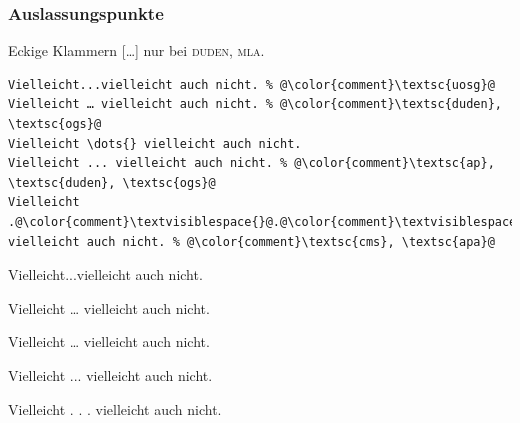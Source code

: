 \documentclass[aspectratio=169, 10pt]{beamer}
\begin{document}
\begin{frame}[fragile]
    \frametitle{Auslassungspunkte}
    Eckige Klammern [\dots{}] nur bei \textsc{duden}, \textsc{mla}.

    \pause

    \begin{lstlisting}[escapechar=\@]
Vielleicht...vielleicht auch nicht. % @\color{comment}\textsc{uosg}@
Vielleicht … vielleicht auch nicht. % @\color{comment}\textsc{duden}, \textsc{ogs}@
Vielleicht \dots{} vielleicht auch nicht.
Vielleicht ... vielleicht auch nicht. % @\color{comment}\textsc{ap}, \textsc{duden}, \textsc{ogs}@
Vielleicht .@\color{comment}\textvisiblespace{}@.@\color{comment}\textvisiblespace{}@. vielleicht auch nicht. % @\color{comment}\textsc{cms}, \textsc{apa}@
        \end{lstlisting}

    Vielleicht...vielleicht auch nicht.

    Vielleicht … vielleicht auch nicht.

    Vielleicht \dots{} vielleicht auch nicht.

    Vielleicht ... vielleicht auch nicht.

    Vielleicht . . . vielleicht auch nicht.\\[2ex]

\end{frame}
\end{document}
